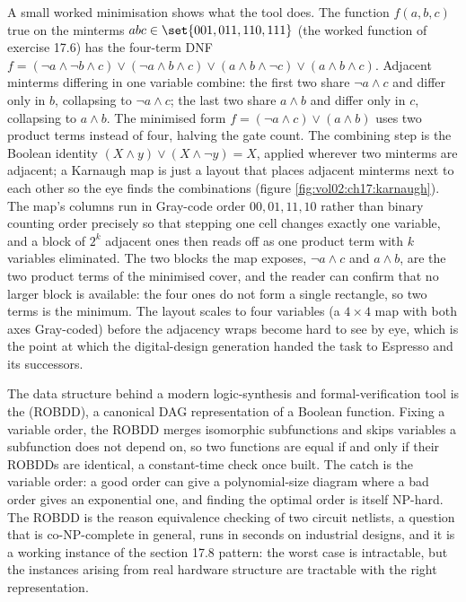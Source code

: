 A small worked minimisation shows what the tool does. The function
$f(a, b, c)$ true on the minterms $abc \in \set{001, 011, 110, 111}$
(the worked function of exercise 17.6) has the four-term DNF $f =
(\lnot a \land \lnot b \land c) \lor (\lnot a \land b \land c) \lor
(a \land b \land \lnot c) \lor (a \land b \land c)$. Adjacent
minterms differing in one variable combine: the first two share
$\lnot a \land c$ and differ only in $b$, collapsing to $\lnot a
\land c$; the last two share $a \land b$ and differ only in $c$,
collapsing to $a \land b$. The minimised form $f = (\lnot a \land c)
\lor (a \land b)$ uses two product terms instead of four, halving
the gate count. The combining step is the Boolean identity $(X \land
y) \lor (X \land \lnot y) = X$, applied wherever two minterms are
adjacent; a Karnaugh map is just a layout that places adjacent
minterms next to each other so the eye finds the combinations
(figure \ref{fig:vol02:ch17:karnaugh}). The map's columns run in
Gray-code order $00, 01, 11, 10$ rather than binary counting order
precisely so that stepping one cell changes exactly one variable, and
a block of $2^{k}$ adjacent ones then reads off as one product term
with $k$ variables eliminated. The two blocks the map exposes,
$\lnot a \land c$ and $a \land b$, are the two product terms of the
minimised cover, and the reader can confirm that no larger block is
available: the four ones do not form a single rectangle, so two terms
is the minimum. The layout scales to four variables (a $4 \times 4$
map with both axes Gray-coded) before the adjacency wraps become hard
to see by eye, which is the point at which the digital-design
generation handed the task to Espresso and its successors.



\begin{mastery}
The data structure behind a modern logic-synthesis and
formal-verification tool is the  (ROBDD), a canonical DAG representation of a
Boolean function. Fixing a variable order, the ROBDD merges
isomorphic subfunctions and skips variables a subfunction does not
depend on, so two functions are equal if and only if their ROBDDs
are identical, a constant-time check once built. The catch is the
variable order: a good order can give a polynomial-size diagram
where a bad order gives an exponential one, and finding the optimal
order is itself NP-hard. The ROBDD is the reason equivalence
checking of two circuit netlists, a question that is co-NP-complete
in general, runs in seconds on industrial designs, and it is a
working instance of the section 17.8 pattern: the worst case is
intractable, but the instances arising from real hardware structure
are tractable with the right representation.
\end{mastery}

